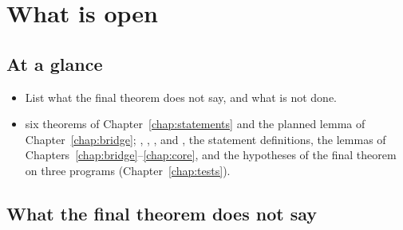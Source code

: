 \chapter{What is open}\label{chap:open}

\section*{At a glance}
\begin{itemize}
\item {} List what the final theorem does not say, and what is not done.
\item {} \stOpen{} six theorems of Chapter~\ref{chap:statements} and the planned lemma
  of Chapter~\ref{chap:bridge}; \stProved{} , , ,  and , the statement definitions, the lemmas of Chapters~\ref{chap:bridge}--\ref{chap:core},
  and the hypotheses of the final theorem on three programs (Chapter~\ref{chap:tests}).
\end{itemize}

\section{What the final theorem does not say}\label{sec:open-notsay}

